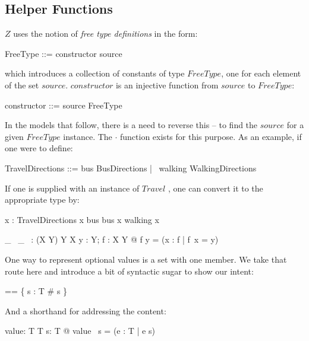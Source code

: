 \documentclass[fuzz]{llncs}
\def\entryFor{\cdot}
\begin{document}
\subsection{Helper Functions}
${Z}$ uses the notion of \textit{free type definitions} in the form: 
\begin{syntax}
FreeType ::= constructor \ldata source \rdata
\end{syntax}
which introduces a collection of constants of type $FreeType$, one for each element of the set $source$.  $constructor$ is an injective function from $source$ to $FreeType$:
\begin{syntax}
constructor ::= source \inj FreeType
\end{syntax}
In the models that follow, there is a need to reverse this -- to find the $source$ for a given $FreeType$ instance. The 
$\entryFor$ function exists for this purpose.  As an example, if one were to define:
\begin{syntax}
TravelDirections ::= bus \ldata BusDirections \rdata | \ walking \ldata WalkingDirections \rdata
\end{syntax}
If one is supplied with an instance of $Travel$ , one can convert it to the appropriate type by:
\begin{syntax}
x : TravelDirections
\where
\IF x \in \ran bus \THEN bus \entryFor x \ELSE walking \entryFor x
\end{syntax}

\begin{gendef}[X, Y]
    \_~  \entryFor \_~   : (X \inj Y) \cross Y \pfun X
   \where %
   \forall y : Y; f : X \inj Y @  f \entryFor y =
   (\mu x : \dom f | f~x = y)
\end{gendef}

One way to represent optional values is a set with one member.  We take that route here 
and introduce a bit of syntactic sugar to show our intent:
\begin{zed} 
  \optional[T] == \{ s : \power T \mid \# s  \} \\
\end{zed}

And a shorthand for addressing the content:
\begin{gendef}[T]
   value: \power T \pfun T
\where
   \forall s: \power T @ value~ s = (\mu e : T | e \in s) 
\end{gendef}



\end{document}
